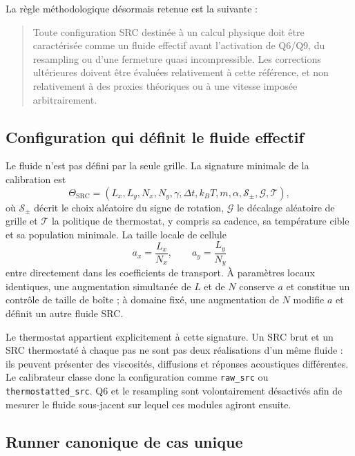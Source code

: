 \documentclass[11pt,a4paper]{article}
\begin{document}
La règle méthodologique désormais retenue est la suivante :
\begin{quote}
Toute configuration SRC destinée à un calcul physique doit être caractérisée comme un fluide effectif avant l'activation de Q6/Q9, du resampling ou d'une fermeture quasi incompressible. Les corrections ultérieures doivent être évaluées relativement à cette référence, et non relativement à des proxies théoriques ou à une vitesse imposée arbitrairement.
\end{quote}

\subsection{Configuration qui définit le fluide effectif}

Le fluide n'est pas défini par la seule grille. La signature minimale de la calibration est
\begin{equation}
\Theta_{\mathrm{SRC}}=
\left(
L_x,L_y,N_x,N_y,\gamma,\Delta t,k_BT,m,\alpha,
\mathcal{S}_{\pm},\mathcal{G},\mathcal{T}
\right),
\end{equation}
où $\mathcal{S}_{\pm}$ décrit le choix aléatoire du signe de rotation, $\mathcal{G}$ le décalage aléatoire de grille et $\mathcal{T}$ la politique de thermostat, y compris sa cadence, sa température cible et sa population minimale. La taille locale de cellule
\begin{equation}
  a_x=\frac{L_x}{N_x},\qquad a_y=\frac{L_y}{N_y}
\end{equation}
entre directement dans les coefficients de transport. À paramètres locaux identiques, une augmentation simultanée de $L$ et de $N$ conserve $a$ et constitue un contrôle de taille de boîte ; à domaine fixé, une augmentation de $N$ modifie $a$ et définit un autre fluide SRC.

Le thermostat appartient explicitement à cette signature. Un SRC brut et un SRC thermostaté à chaque pas ne sont pas deux réalisations d'un même fluide : ils peuvent présenter des viscosités, diffusions et réponses acoustiques différentes. Le calibrateur classe donc la configuration comme \texttt{raw\_src} ou \texttt{thermostatted\_src}. Q6 et le resampling sont volontairement désactivés afin de mesurer le fluide sous-jacent sur lequel ces modules agiront ensuite.

\subsection{Runner canonique de cas unique}
\end{document}
